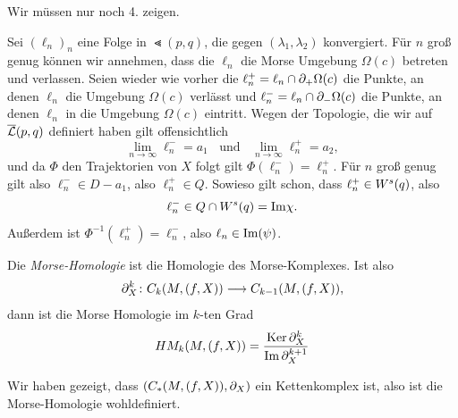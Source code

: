 \begin{bigproof}
    Wir müssen nur noch 4. zeigen.

    Sei $(\ell_n)_n$ eine Folge in $\Lt (p, q)$, die gegen $(\lambda_1, \lambda_2)$ konvergiert. 
    Für $n$ groß genug können wir annehmen, dass die $\ell_n$ die Morse Umgebung $\Omega (c)$ betreten 
    und verlassen. Seien wieder wie vorher die $\ell_n^+ = \ell_n \cap { \partial }_+ \Omega (c)$ die Punkte, 
    an denen $\ell_n$ die Umgebung $\Omega (c)$ verlässt und $\ell_n^- = \ell_n \cap { \partial }_- \Omega (c)$
    die Punkte, an denen $\ell_n$ in die Umgebung $\Omega (c)$ eintritt. Wegen der Topologie, die wir 
    auf ${\overline{\mathcal{L}} }(p, q)$ definiert haben gilt offensichtlich
    \[ \lim_{n \to \infty} \ell_n^- = a_1 \; \; \text{ und } \; \; \lim_{n \to \infty} \ell_n^+ = a_2 , \]
    und da $\Phi$ den Trajektorien von $X$ folgt gilt $\Phi(\ell_n^-) = \ell_n^+$.
    Für $n$ groß genug gilt also $\ell_n^- \in D - a_1$, also $\ell_n^+ \in Q$. Sowieso gilt schon, dass
    $\ell_n^+ \in { W^s } (q)$, also 
    \[ \ell_n^- \in Q \cap { W^s } (q) = { \operatorname{Im} } \chi . \]
    Außerdem ist $\Phi^{-1}(\ell_n^+) = \ell_n^-$, also $\ell_n \in { \operatorname{Im} } (\psi)$.
\end{bigproof}

\begin{definition}
    \label{def: morse-homologie}
    Die \textit{Morse-Homologie} ist die Homologie des Morse-Komplexes. Ist also
    \[ { \partial }_X^k \colon C_k (M, (f, X)) \longrightarrow C_{k - 1} (M, (f, X)), \]
    dann ist die Morse Homologie im $k$-ten Grad 
    \[ HM_k (M, (f, X)) = \frac{{ \operatorname{Ker} } \, { \partial }_X^k}{{ \operatorname{Im} } \, { \partial }_X^{k + 1}} \]
\end{definition}

Wir haben gezeigt, dass $(C_{\ast}(M, (f, X)), { \partial }_X)$ ein Kettenkomplex ist, also ist die 
Morse-Homologie wohldefiniert.



